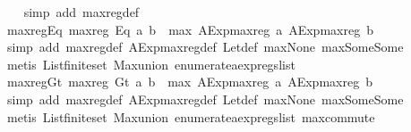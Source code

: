 \begin{isabellebody}
%
\isadelimproof
\ \ %
\endisadelimproof
%
\isatagproof
{}\isamarkupfalse%
\ {\isacharparenleft}simp\ add{\isacharcolon}\ max{\isacharunderscore}reg{\isacharunderscore}def{\isacharparenright}%
\endisatagproof
{\isafoldproof}%
%
\isadelimproof
\isanewline
%
\endisadelimproof
\isanewline
{}\isamarkupfalse%
\ max{\isacharunderscore}reg{\isacharunderscore}Eq{\isacharcolon}\ {\isachardoublequoteopen}max{\isacharunderscore}reg\ {\isacharparenleft}Eq\ a\ b{\isacharparenright}\ {\isacharequal}\ max\ {\isacharparenleft}AExp{\isachardot}max{\isacharunderscore}reg\ a{\isacharparenright}\ {\isacharparenleft}AExp{\isachardot}max{\isacharunderscore}reg\ b{\isacharparenright}{\isachardoublequoteclose}\isanewline
%
\isadelimproof
\ \ %
\endisadelimproof
%
\isatagproof
{}\isamarkupfalse%
\ {\isacharparenleft}simp\ add{\isacharcolon}\ max{\isacharunderscore}reg{\isacharunderscore}def\ AExp{\isachardot}max{\isacharunderscore}reg{\isacharunderscore}def\ Let{\isacharunderscore}def\ max{\isacharunderscore}None\ max{\isacharunderscore}Some{\isacharunderscore}Some{\isacharparenright}\isanewline
\ \ \isamarkupfalse%
\ {\isacharparenleft}metis\ List{\isachardot}finite{\isacharunderscore}set\ Max{\isachardot}union\ enumerate{\isacharunderscore}aexp{\isacharunderscore}regs{\isacharunderscore}list{\isacharparenright}%
\endisatagproof
{\isafoldproof}%
%
\isadelimproof
\isanewline
%
\endisadelimproof
\isanewline
{}\isamarkupfalse%
\ max{\isacharunderscore}reg{\isacharunderscore}Gt{\isacharcolon}\ {\isachardoublequoteopen}max{\isacharunderscore}reg\ {\isacharparenleft}Gt\ a\ b{\isacharparenright}\ {\isacharequal}\ max\ {\isacharparenleft}AExp{\isachardot}max{\isacharunderscore}reg\ a{\isacharparenright}\ {\isacharparenleft}AExp{\isachardot}max{\isacharunderscore}reg\ b{\isacharparenright}{\isachardoublequoteclose}\isanewline
%
\isadelimproof
\ \ %
\endisadelimproof
%
\isatagproof
{}\isamarkupfalse%
\ {\isacharparenleft}simp\ add{\isacharcolon}\ max{\isacharunderscore}reg{\isacharunderscore}def\ AExp{\isachardot}max{\isacharunderscore}reg{\isacharunderscore}def\ Let{\isacharunderscore}def\ max{\isacharunderscore}None\ max{\isacharunderscore}Some{\isacharunderscore}Some{\isacharparenright}\isanewline
\ \ \isamarkupfalse%
\ {\isacharparenleft}metis\ List{\isachardot}finite{\isacharunderscore}set\ Max{\isachardot}union\ enumerate{\isacharunderscore}aexp{\isacharunderscore}regs{\isacharunderscore}list\ max{\isachardot}commute{\isacharparenright}%
\endisatagproof
{\isafoldproof}%
%
\isadelimproof

\end{isabellebody}
